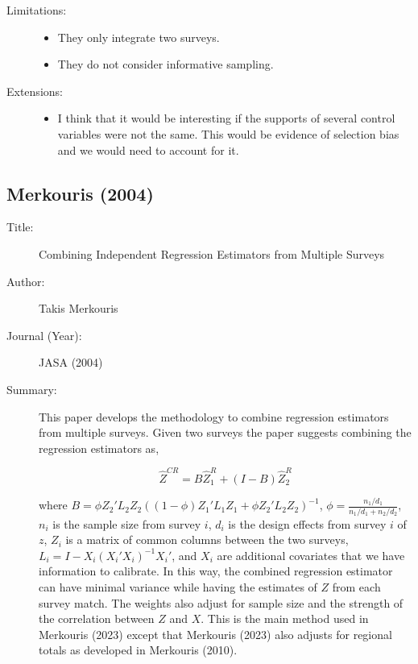 \documentclass[12pt]{article}
\begin{document}
\begin{description}
  \item[Limitations:]\;
    \begin{itemize}
      \item They only integrate two surveys.
      \item They do not consider informative sampling. %
    \end{itemize}
  \item[Extensions:]\;
    \begin{itemize}
      \item I think that it would be interesting if the supports of several
        control variables were not the same. This would be evidence of selection
        bias and we would need to account for it.
    \end{itemize}
\end{description}

\subsection*{Merkouris (2004)}

\begin{description}
  \item[Title:] Combining Independent Regression Estimators from Multiple
    Surveys 

  \item[Author:] Takis Merkouris

  \item[Journal (Year):] JASA (2004)
  \item[Summary:] This paper develops the methodology to combine regression
    estimators from multiple surveys. Given two surveys the paper suggests
    combining the regression estimators as,

    \[\hat Z^{CR} = B\hat Z_1^R + (I - B) \hat Z_2^R\]

    where $B = \phi Z_2' L_2 Z_2 ((1 - \phi) Z_1'L_1 Z_1 + \phi Z_2'L_2
    Z_2)^{-1}$, $\phi = \frac{n_1 / d_1}{n_1 / d_1 + n_2 / d_2}$, $n_i$ is the
    sample size from survey $i$, $d_i$ is the design effects from survey $i$ of
    $z$, $Z_i$ is a matrix of common columns between the two surveys, 
    $L_i = I - X_i (X_i' X_i)^{-1} X_i'$, and $X_i$ are additional covariates
    that we have information to calibrate. In this way, the combined regression
    estimator can have minimal variance while having the estimates of $Z$ from
    each survey match. The weights also adjust for sample size and the strength
    of the correlation between $Z$ and $X$. This is the main method used in
    Merkouris (2023) except that Merkouris (2023) also adjusts for regional
    totals as developed in Merkouris (2010).

\end{description}
\end{document}
